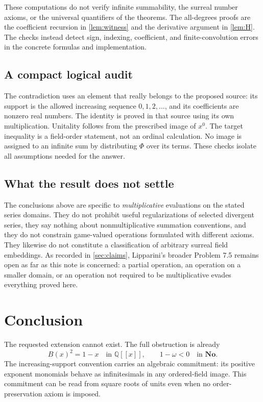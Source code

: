 \documentclass[11pt,letterpaper]{article}
\theoremstyle{definition}
\theoremstyle{remark}
\newcommand{\No}{\mathbf{No}}
\newcommand{\Q}{\mathbb Q}
\begin{document}
These computations do not verify infinite summability, the surreal number
axioms, or the universal quantifiers of the theorems. The all-degrees proofs
are the coefficient recursion in \cref{lem:witness} and the derivative
argument in \cref{lem:H}. The checks instead detect sign, indexing,
coefficient, and finite-convolution errors in the concrete formulas and
implementation.

\subsection{A compact logical audit}
The contradiction uses an element that really belongs to the proposed source:
its support is the allowed increasing sequence $0,1,2,\ldots$, and its
coefficients are nonzero real numbers. The identity is proved in that source
using its own multiplication. Unitality follows from the prescribed image of
$x^0$. The target inequality is a field-order statement, not an ordinal
calculation. No image is assigned to an infinite sum by distributing $\Phi$
over its terms. These checks isolate all assumptions needed for the answer.

\subsection{What the result does not settle}
The conclusions above are specific to \emph{multiplicative} evaluations on the
stated series domains. They do not prohibit useful regularizations of selected
divergent series, they say nothing about nonmultiplicative summation
conventions, and they do not constrain game-valued operations formulated with
different axioms. They likewise do not constitute a classification of
arbitrary surreal field embeddings. As recorded in \cref{sec:claims},
Lipparini's broader Problem 7.5 remains open as far as this note is concerned:
a partial operation, an operation on a smaller domain, or an operation not
required to be multiplicative evades everything proved here.

\section{Conclusion}
The requested extension cannot exist. The full obstruction is already
\[
 \boxed{\quad B(x)^2=1-x\quad\text{in }\Q[[x]],\qquad 1-\omega<0
        \quad\text{in }\No.\quad}
\]
The increasing-support convention carries an algebraic commitment: its
positive exponent monomials behave as infinitesimals in any ordered-field
image. This commitment can be read from square roots of units even when no
order-preservation axiom is imposed.
\end{document}
